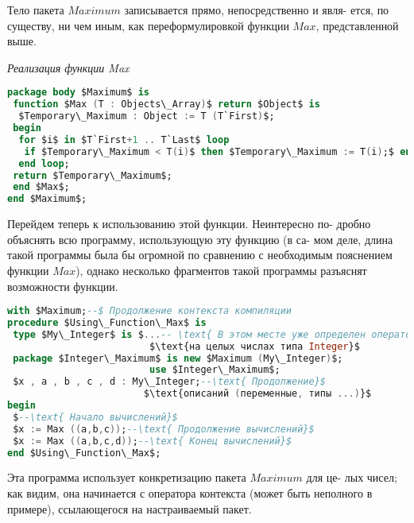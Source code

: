 \documentclass{./git_rep/mai_prac_2017/template/mai_book}
\begin{document}
Тело пакета $Maximum$ записывается прямо, непосредственно и явля­-\linebreak
ется, по существу, ни чем иным, как переформулировкой функции $Max$,\linebreak
представленной выше.
\begin{center}
\textit{Реализация функции Max}
\end{center}
\begin{lstlisting}[mathescape=true, language=Ada, xleftmargin=15pt]
package body $Maximum$ is
 function $Max (T : Objects\_Array)$ return $Object$ is
  $Temporary\_Maximum : Object := T (T`First)$;
 begin
  for $i$ in $T`First+1 .. T`Last$ loop
   if $Temporary\_Maximum < T(i)$ then $Temporary\_Maximum := T(i);$ end if;
  end loop;
 return $Temporary\_Maximum$;
 end $Max$;
end $Maximum$;
\end{lstlisting}
\hspace*{15pt}Перейдем теперь к использованию этой функции. Неинтересно по-\linebreak
дробно объяснять всю программу, использующую эту функцию (в са-\linebreak
мом деле, длина такой программы была бы огромной по сравнению с\linebreak
необходимым пояснением функции $Max$), однако несколько фрагментов\linebreak
такой программы разъяснят возможности функции.
\newpage
\begin{lstlisting}[mathescape=true, language=Ada, frame=none, xleftmargin=15pt]
with $Maximum;--$ Продолжение контекста компиляции
procedure $Using\_Function\_Max$ is
 type $My\_Integer$ is $...-- \text{ В этом месте уже определен оператор "<"}$
                         $\text{на целых числах типа Integer}$
 package $Integer\_Maximum$ is new $Maximum (My\_Integer)$;
                         use $Integer\_Maximum$;
 $x , a , b , c , d : My\_Integer;--\text{ Продолжение}$
                        $\text{описаний (переменные, типы ...)}$
begin
 $--\text{ Начало вычислений}$
 $x := Max ((a,b,c));--\text{ Продолжение вычислений}$
 $x := Max ((a,b,c,d));--\text{ Конец вычислений}$
end $Using\_Function\_Max$;
\end{lstlisting}
\hspace*{15pt}Эта программа использует конкретизацию пакета $Maximum$ для це-\linebreak
лых чисел; как видим, она начинается с оператора контекста (может\linebreak
быть неполного в примере), ссылающегося на настраиваемый пакет.\linebreak
\end{document}
